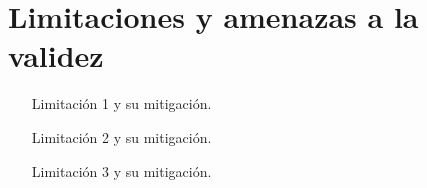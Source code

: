 \section{Limitaciones y amenazas a la validez}

\begin{itemize}
  \item [Limitación 1 y su mitigación.]
  \item [Limitación 2 y su mitigación.]
  \item [Limitación 3 y su mitigación.]
\end{itemize}
